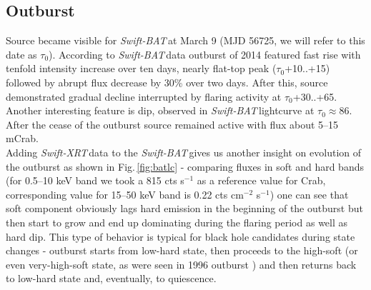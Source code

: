 \documentclass[a4paper,fleqn,usenatbib]{mnras}
\def\swiftx{{\em Swift-XRT\,}}
\def\swiftb{{\em Swift-BAT\,}}
\begin{document}
\subsection{Outburst}
Source became visible for \swiftb at March 9 (MJD 56725, we will refer to this date as $\tau_{0}$). According to \swiftb data outburst of 2014 featured fast rise with tenfold intensity increase over ten days, nearly flat-top peak ($\tau_{0}$+10..+15) followed by abrupt flux decrease by 30\% over two days. After this, source demonstrated gradual decline interrupted by flaring activity at $\tau_{0}$+30..+65. Another interesting feature is dip, observed in \swiftb lightcurve at $\tau_{0} \approx 86$. After the cease of the outburst source remained active with flux about 5--15 mCrab. \\
Adding \swiftx data to the \swiftb gives us another insight on evolution of the outburst as shown in Fig.\,\ref{fig:batlc} - comparing fluxes in soft and hard bands (for 0.5--10 keV band we took a 815 cts s$^{-1}$ as a reference value for Crab, corresponding value for 15--50 keV band is 0.22 cts cm$^{-2}$ s$^{-1}$) one can see that soft component obviously lags hard emission in the beginning of the outburst but then start to grow and end up dominating during the flaring period as well as hard dip. This type of behavior is typical for black hole candidates \citep[BHC, see e.g.][]{grebenev93, grebenev97, tanaka96, remillard06, belloni10} during state changes - outburst starts from low-hard state, then proceeds to the high-soft (or even very-high-soft state, as were seen in 1996 outburst \citep{borozdin00}) and then returns back to low-hard state and, eventually, to quiescence.
\end{document}
